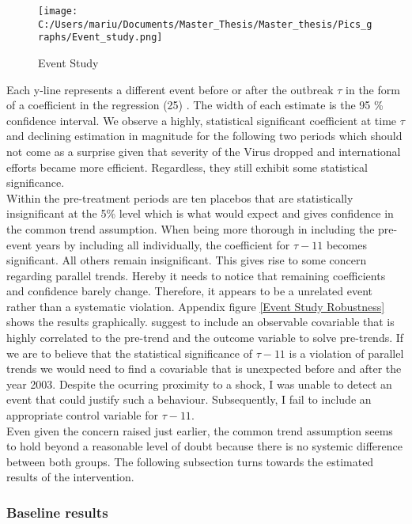 \documentclass{article}
\begin{document}
\begin{figure}[!ht]
\begin{center}\caption{Event Study \label{Event Study}}
\texttt{[image: C:/Users/mariu/Documents/Master\_Thesis/Master\_thesis/Pics\_graphs/Event\_study.png]}\\
\end{center}
\end{figure}

Each y-line represents a different event before or after the outbreak $\tau$ in the form of a coefficient in the regression (25) . The width of each estimate is the 95 \% confidence interval. We observe a highly, statistical significant coefficient at time $\tau$ and declining  estimation in magnitude for the following two periods which should not come as a surprise given that severity of the Virus dropped and international efforts became more efficient. Regardless, they still exhibit some statistical significance.\\
Within the pre-treatment periods are ten placebos that are statistically insignificant at the 5\% level which is what would expect and gives confidence in the common trend assumption. When being more thorough in including the pre-event years by including all individually, the coefficient for $\tau - 11$ becomes significant. All others remain insignificant. This gives rise to some concern regarding parallel trends. Hereby it needs to notice that remaining coefficients and confidence barely change. Therefore, it appears to be a unrelated event rather than a systematic violation. Appendix figure \ref{Event Study Robustness} shows the results graphically. \cite{freyal2018pre} suggest to include an observable covariable that is highly correlated to the pre-trend and the outcome variable to solve pre-trends. If we are to believe that the statistical significance of $\tau - 11$ is a violation of parallel trends we would need to find a covariable that is unexpected before and after the year 2003. Despite the ocurring proximity to a shock, I was unable to detect an event that could justify such a behaviour. Subsequently, I fail to include an appropriate control variable for $\tau - 11$.\\
Even given the concern raised just earlier, the common trend assumption seems to hold beyond a reasonable level of doubt because there is no systemic difference between both groups. The following subsection turns towards the estimated results of the intervention.

\subsubsection{Baseline results}
\end{document}
